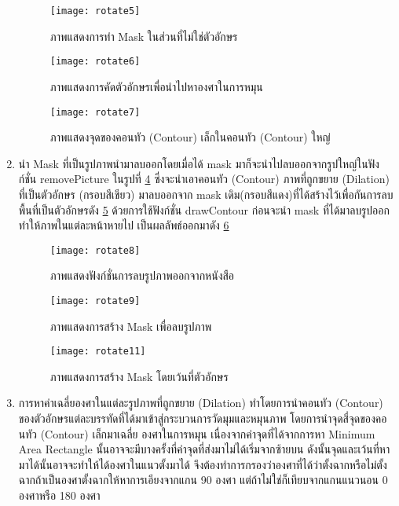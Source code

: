 \begin{enumerate}
    \begin{figure}[H]
        \centering
        \texttt{[image: rotate5]}
        \caption{ภาพแสดงการทำ Mask ในส่วนที่ไม่ใช่ตัวอักษร}\label{fig:rotate5}
    \end{figure}

    \begin{figure}[H]
        \centering
        \texttt{[image: rotate6]}
        \caption{ภาพแสดงการคัดตัวอักษรเพื่อนำไปหาองศาในการหมุน}\label{fig:rotate6}
    \end{figure}

    \begin{figure}[H]
        \centering
        \texttt{[image: rotate7]}
        \caption{ภาพแสดงจุดของคอนทัว (Contour) เล็กในคอนทัว (Contour) ใหญ่}\label{fig:rotate7}
    \end{figure}

    \item นำ Mask ที่เป็นรูปภาพนำมาลบออกโดยเมื่อได้ mask มาก็จะนำไปลบออกจากรูปใหญ่ในฟังก์ชั่น removePicture 
    ในรูปที่ \ref{fig:rotate8}  ซึ่งจะนำเอาคอนทัว (Contour) ภาพที่ถูกขยาย (Dilation) ที่เป็นตัวอักษร (กรอบสีเขียว) 
    มาลบออกจาก mask เดิม(กรอบสีแดง)ที่ได้สร้างไว้เพื่อกันการลบพื้นที่เป็นตัวอักษรดัง \ref{fig:rotate9} ด้วยการใช้ฟังก์ชั่น 
    drawContour ก่อนจะนำ mask ที่ได้มาลบรูปออกทำให้ภาพในแต่ละหน้าหายไป เป็นผลลัพธ์ออกมาดัง \ref{fig:rotate11}
    
    \begin{figure}[H]
        \centering
        \texttt{[image: rotate8]}
        \caption{ภาพแสดงฟังก์ชั่นการลบรูปภาพออกจากหนังสือ}\label{fig:rotate8}
    \end{figure}

    \begin{figure}[H]
        \centering
        \texttt{[image: rotate9]}
        \caption{ภาพแสดงการสร้าง Mask เพื่อลบรูปภาพ}\label{fig:rotate9}
    \end{figure}

    \begin{figure}[H]
        \centering
        \texttt{[image: rotate11]}
        \caption{ภาพแสดงการสร้าง Mask โดยเว้นที่ตัวอักษร}\label{fig:rotate11}
    \end{figure}

    \item การหาค่าเฉลี่ยองศาในแต่ละรูปภาพที่ถูกขยาย (Dilation) ทำโดยการนำคอนทัว (Contour) 
    ของตัวอักษรแต่ละบรรทัดที่ได้มาเข้าสู่กระบวนการวัดมุมและหมุนภาพ โดยการนำจุดสี่จุดของคอนทัว (Contour) 
    เล็กมาเฉลี่ย องศาในการหมุน เนื่องจากค่าจุดที่ได้จากการหา Minimum Area Rectangle 
    นั้นอาจจะมีบางครั้งที่ค่าจุดที่ส่งมาไม่ได้เริ่มจากซ้ายบน ดังนั้นจุดและเว้นที่หามาได้นั้นอาจจะทำให้ได้องศาในแนวตั้งมาได้ 
    จึงต้องทำการกรองว่าองศาที่ได้ว่าตั้งฉากหรือไม่ตั้งฉากถ้าเป็นองศาตั้งฉากให้หาการเอียงจากแกน 90 องศา 
    แต่ถ้าไม่ใช่ก็เทียบจากแกนแนวนอน 0 องศาหรือ 180 องศา


\end{enumerate}
